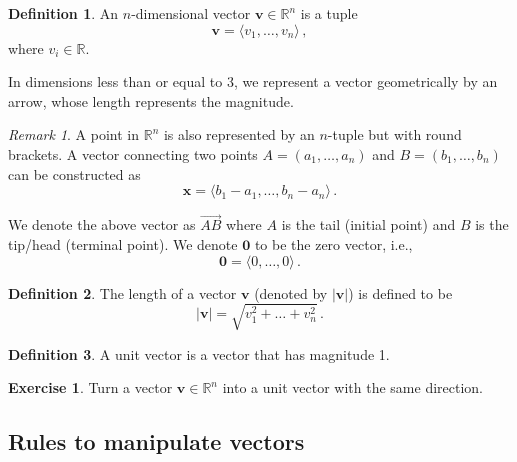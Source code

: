 \documentclass[
]{article}
\theoremstyle{definition}
\newtheorem{definition}{Definition}[section]
\theoremstyle{definition}
\theoremstyle{definition}
\newtheorem{exercise}{Exercise}[section]
\theoremstyle{definition}
\theoremstyle{remark}
\newtheorem*{remark}{Remark}
\begin{document}
\begin{definition}
An \(n\)-dimensional vector \(\textbf{v}\in \mathbb{R}^n\) is a tuple
\begin{equation}
    \textbf{v} = \langle v_1,\dots, v_n \rangle \,,
\end{equation}
where \(v_i \in \mathbb{R}\).
\end{definition}

In dimensions less than or equal to 3, we represent a vector
geometrically by an arrow, whose length represents the magnitude.

\begin{remark}
A point in \(\mathbb{R}^n\) is also represented by an \(n\)-tuple
but with round brackets.
A vector connecting two points \(A= (a_1, \dots, a_n)\)
and \(B=(b_1, \dots, b_n)\) can be constructed as
\begin{equation*}
    \textbf{x} =  \langle b_1-a_1, \dots, b_n - a_n \rangle \,.
\end{equation*}

We denote the above vector as \(\vec{AB}\) where \(A\) is the tail (initial point)
and \(B\) is the tip/head (terminal point).
We denote \(\textbf{0}\) to be the zero vector, i.e.,
\begin{equation*}
    \textbf{0} = \langle 0, \dots, 0 \rangle \,.
\end{equation*}
\end{remark}

\begin{definition}
The length of a vector \(\textbf{v}\) (denoted by \(| \textbf{v}|\)) is defined to be
\begin{equation}
    |\textbf{v}| = \sqrt{ v_1^2 + \dots + v_n^2} \,.
\end{equation}
\end{definition}

\begin{definition}
A unit vector is a vector that has magnitude 1.
\end{definition}

\begin{exercise}
Turn a vector \(\textbf{v} \in \mathbb{R}^n\) into a unit vector with the same
direction.
\end{exercise}

\subsection*{Rules to manipulate vectors}\label{rules-to-manipulate-vectors}
\end{document}
